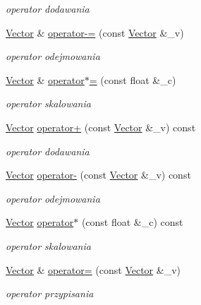 \begin{DoxyCompactItemize}
\begin{DoxyCompactList}\small\item\em operator dodawania \end{DoxyCompactList}\item 
\hyperlink{class_vector}{Vector} \& \hyperlink{class_vector_aaaf87dbf15cd9492aa0c11874ae5afef}{operator-\/=} (const \hyperlink{class_vector}{Vector} \&\-\_\-v)
\begin{DoxyCompactList}\small\item\em operator odejmowania \end{DoxyCompactList}\item 
\hyperlink{class_vector}{Vector} \& \hyperlink{class_vector_a91ebac6d502ca1d54645e7c711549867}{operator$\ast$=} (const float \&\-\_\-c)
\begin{DoxyCompactList}\small\item\em operator skalowania \end{DoxyCompactList}\item 
\hyperlink{class_vector}{Vector} \hyperlink{class_vector_aa78eb4c9e5ac236c89f0853eefa347ac}{operator+} (const \hyperlink{class_vector}{Vector} \&\-\_\-v) const 
\begin{DoxyCompactList}\small\item\em operator dodawania \end{DoxyCompactList}\item 
\hyperlink{class_vector}{Vector} \hyperlink{class_vector_a94b6fde82bef6532c00358a0af448fc1}{operator-\/} (const \hyperlink{class_vector}{Vector} \&\-\_\-v) const 
\begin{DoxyCompactList}\small\item\em operator odejmowania \end{DoxyCompactList}\item 
\hyperlink{class_vector}{Vector} \hyperlink{class_vector_a8f0e64ee9a688803b1efce30fb0b2869}{operator$\ast$} (const float \&\-\_\-c) const 
\begin{DoxyCompactList}\small\item\em operator skalowania \end{DoxyCompactList}\item 
\hyperlink{class_vector}{Vector} \& \hyperlink{class_vector_ad44f6d9721d9584e7f847e449df73e11}{operator=} (const \hyperlink{class_vector}{Vector} \&\-\_\-v)
\begin{DoxyCompactList}\small\item\em operator przypisania \end{DoxyCompactList}\item 

\end{DoxyCompactItemize}
